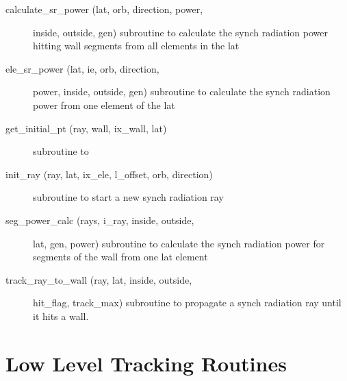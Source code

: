 \begin{description}

\item[calculate_sr_power (lat, orb, direction, power,] \Newline 
                                 inside, outside, gen)
subroutine to calculate the synch radiation power
hitting wall segments from all elements in the lat

\item[ele_sr_power (lat, ie, orb, direction,] \Newline 
                            power, inside, outside, gen)
subroutine to calculate the synch radiation power from
one element of the lat

\item[get_initial_pt (ray, wall, ix_wall, lat)] \Newline 
subroutine to

\item[init_ray (ray, lat, ix_ele, l_offset, orb, direction)] \Newline 
subroutine to start a new synch radiation ray

\item[seg_power_calc (rays, i_ray, inside, outside, ] \Newline 
                            lat, gen, power)
subroutine to calculate the synch radiation power for
segments of the wall from one lat element

\item[track_ray_to_wall (ray, lat, inside, outside, ] \Newline 
                               hit_flag, track_max)
subroutine to propagate a synch radiation ray until it hits a wall.



\end{description}

\section{Low Level Tracking Routines}
\label{r:low_track}

